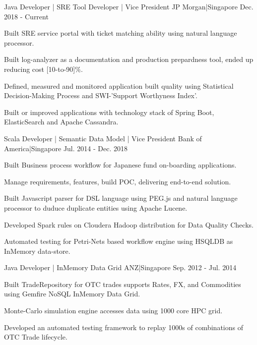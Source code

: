 \begin{cventries}
    {Java Developer | SRE Tool Developer | Vice President}
    {JP Morgan|Singapore}
    {Dec. 2018 - Current}
    {
      \begin{cvitems}
        \item {Built SRE service portal with ticket matching ability using natural language processor.}
        \item {Built log-analyzer as a documentation and production prepardness tool, ended up reducing cost [10-to-90]\%.}
        \item {Defined, measured and monitored application built quality using Statistical Decision-Making Process and SWI-'Support Worthyness Index'.}
        \item {Built or improved applications with technology stack of Spring Boot, ElasticSearch and Apache Cassandra.}
      \end{cvitems}
    }
    {Scala Developer | Semantic Data Model | Vice President}
    {Bank of America|Singapore}
    {Jul. 2014 - Dec. 2018}
    {
      \begin{cvitems}
        \item {Built Business process workflow for Japanese fund on-boarding applications.}
        \item {Manage requirements, features, build POC, delivering end-to-end solution.}
        \item {Built Javascript parser for DSL language using PEG.js and natural language processor to duduce duplicate entities using Apache Lucene.}
        \item {Developed Spark rules on Cloudera Hadoop distribution for Data Quality Checks.}
        \item {Automated testing for Petri-Nets based workflow engine using HSQLDB as InMemory data-store.}
      \end{cvitems}
    }
    {Java Developer | InMemory Data Grid}
    {ANZ|Singapore}
    {Sep. 2012 - Jul. 2014}
    {
      \begin{cvitems}
        \item {Built TradeRepository for OTC trades  supports Rates, FX, and Commodities using Gemfire NoSQL InMemory Data Grid.}
        \item {Monte-Carlo simulation engine accesses data using 1000 core HPC grid.}
        \item {Developed an automated testing framework to replay 1000s of combinations of OTC Trade lifecycle.}

\end{cvitems}}
\end{cventries}
